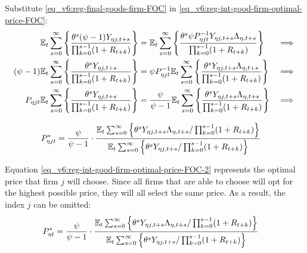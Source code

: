 \documentclass[../thesis.tex]{subfiles}
\begin{document}
Substitute \ref{eq_v6:reg-final-goods-firm-FOC} in \ref{eq_v6:reg-int-good-firm-optimal-price-FOC}:
\begin{alignat}{2}
	{\mathbb{E}_{t}} \sum_{s=0}^{\infty} \Bigg\{ \frac{\theta^s (\psi-1) Y_{\eta j,t+s}}{\prod_{k=0}^{s-1}(1+R_{t+k})} \Bigg\} &= {\mathbb{E}_{t}} \sum_{s=0}^{\infty} \Bigg\{ \frac{\theta^s \psi P_{\eta jt}^{-1} Y_{\eta j,t+s} \Lambda_{\eta, t+s}}{\prod_{k=0}^{s-1}(1+R_{t+k})}  \Bigg\} &\implies \nonumber \\
	(\psi-1) {\mathbb{E}_{t}} \sum_{s=0}^{\infty} \Bigg\{ \frac{\theta^s Y_{\eta j,t+s}}{\prod_{k=0}^{s-1}(1+R_{t+k})} \Bigg\} &= \psi P_{\eta jt}^{-1} {\mathbb{E}_{t}} \sum_{s=0}^{\infty} \Bigg\{ \frac{\theta^s Y_{\eta j,t+s} \Lambda_{\eta, t+s}}{\prod_{k=0}^{s-1}(1+R_{t+k})}  \Bigg\} &\implies \nonumber \\
	P_{\eta jt} {\mathbb{E}_{t}} \sum_{s=0}^{\infty} \Bigg\{ \frac{\theta^s Y_{\eta j,t+s}}{\prod_{k=0}^{s-1}(1+R_{t+k})} \Bigg\} &= \frac{\psi}{\psi-1} {\mathbb{E}_{t}} \sum_{s=0}^{\infty} \Bigg\{ \frac{\theta^s Y_{\eta j,t+s} \Lambda_{\eta, t+s}}{\prod_{k=0}^{s-1}(1+R_{t+k})}  \Bigg\} &\implies \nonumber
\end{alignat}

\vspace*{-1cm}

\begin{align}
	\label{eq_v6:reg-int-good-firm-optimal-price-FOC-2}
	P_{\eta jt}^{\ast} &= 
	\frac{\psi}{\psi-1} \cdot
	\frac{
		{\mathbb{E}_{t}} \sum_{s=0}^{\infty} \left\{ 
		\theta^s Y_{\eta j,t+s} \Lambda_{\eta, t+s} / \prod_{k=0}^{s-1}(1+R_{t+k}) \right\}} {{\mathbb{E}_{t}} \sum_{s=0}^{\infty} \left\{
		\theta^s Y_{\eta j,t+s} / \prod_{k=0}^{s-1}(1+R_{t+k}) \right\}}
\end{align}


Equation \ref{eq_v6:reg-int-good-firm-optimal-price-FOC-2} represents the optimal price that firm $j$ will choose. Since all firms that are able to choose will opt for the highest possible price, they will all select the same price. As a result, the index $j$ can be omitted:
\begin{align}
	\label{eq_v6:reg-int-good-firm-optimal-price-FOC-3}
	P_{\eta t}^{\ast} &= 
	\frac{\psi}{\psi-1} \cdot
	\frac{
		{\mathbb{E}_{t}} \sum_{s=0}^{\infty} \left\{ 
		\theta^s Y_{\eta j,t+s} \Lambda_{\eta, t+s} / \prod_{k=0}^{s-1}(1+R_{t+k}) \right\}} {{\mathbb{E}_{t}} \sum_{s=0}^{\infty} \left\{
		\theta^s Y_{\eta j,t+s} / \prod_{k=0}^{s-1}(1+R_{t+k}) \right\}}
\end{align}

\end{document}
